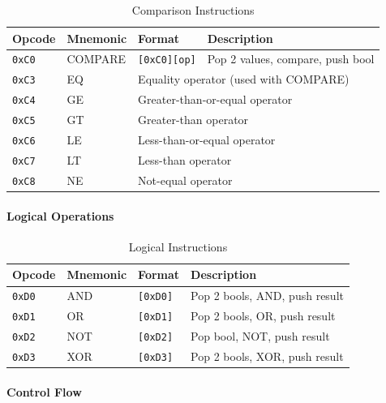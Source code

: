 \documentclass[11pt,a4paper]{article}
\begin{document}
\begin{table}[h]
\centering
\begin{tabular}{@{}llll@{}}
\toprule
Opcode & Mnemonic & Format & Description \\
\midrule
\texttt{0xC0} & COMPARE & \texttt{[0xC0][op]} & Pop 2 values, compare, push bool \\
\texttt{0xC3} & EQ & \multicolumn{2}{l}{Equality operator (used with COMPARE)} \\
\texttt{0xC4} & GE & \multicolumn{2}{l}{Greater-than-or-equal operator} \\
\texttt{0xC5} & GT & \multicolumn{2}{l}{Greater-than operator} \\
\texttt{0xC6} & LE & \multicolumn{2}{l}{Less-than-or-equal operator} \\
\texttt{0xC7} & LT & \multicolumn{2}{l}{Less-than operator} \\
\texttt{0xC8} & NE & \multicolumn{2}{l}{Not-equal operator} \\
\bottomrule
\end{tabular}
\caption{Comparison Instructions}
\end{table}

\paragraph{Logical Operations}

\begin{table}[h]
\centering
\begin{tabular}{@{}llll@{}}
\toprule
Opcode & Mnemonic & Format & Description \\
\midrule
\texttt{0xD0} & AND & \texttt{[0xD0]} & Pop 2 bools, AND, push result \\
\texttt{0xD1} & OR & \texttt{[0xD1]} & Pop 2 bools, OR, push result \\
\texttt{0xD2} & NOT & \texttt{[0xD2]} & Pop bool, NOT, push result \\
\texttt{0xD3} & XOR & \texttt{[0xD3]} & Pop 2 bools, XOR, push result \\
\bottomrule
\end{tabular}
\caption{Logical Instructions}
\end{table}

\paragraph{Control Flow}
\end{document}
